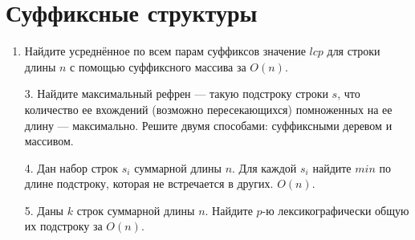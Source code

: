 \section*{Суффиксные структуры}
\begin{enumerate}
	\item Найдите усреднённое по всем парам суффиксов значение $lcp$ для строки длины $n$ с помощью	суффиксного массива за $O(n)$.
	\item[3.] Найдите максимальный рефрен — такую подстроку строки $s$, что количество ее вхождений (возможно пересекающихся) помноженных на ее длину — максимально. Решите двумя способами: суффиксными деревом и массивом.
	\item[4.] Дан набор строк $s_i$ суммарной длины $n$. Для каждой $s_i$ найдите $min$ по длине подстроку, которая не встречается в других. $O(n)$.
	\item[5.] Даны $k$ строк суммарной длины $n$. Найдите $p$-ю лексикографически общую их подстроку за $O(n)$.
\end{enumerate}
